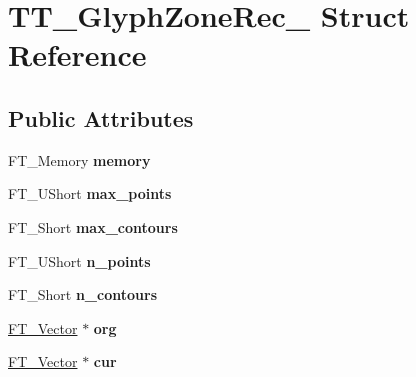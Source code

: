 \hypertarget{struct_t_t___glyph_zone_rec__}{}\section{T\+T\+\_\+\+Glyph\+Zone\+Rec\+\_\+ Struct Reference}
\label{struct_t_t___glyph_zone_rec__}
\subsection*{Public Attributes}
\begin{DoxyCompactItemize}
\item 
\mbox{\label{struct_t_t___glyph_zone_rec___adc8cac6d6d8475aa50946d6bc17fd345}} 
F\+T\+\_\+\+Memory {\bfseries memory}
\item 
\mbox{\label{struct_t_t___glyph_zone_rec___aa06aa1bfd1b7e2082552ea24f96c775e}} 
F\+T\+\_\+\+U\+Short {\bfseries max\+\_\+points}
\item 
\mbox{\label{struct_t_t___glyph_zone_rec___adf1671187fe804f0a117edb76f8cfd12}} 
F\+T\+\_\+\+Short {\bfseries max\+\_\+contours}
\item 
\mbox{\label{struct_t_t___glyph_zone_rec___a2acc389958f0e593f7eed29f7ca15b94}} 
F\+T\+\_\+\+U\+Short {\bfseries n\+\_\+points}
\item 
\mbox{\label{struct_t_t___glyph_zone_rec___a1aa2ffa863fbd8a8985fe3e39e8bb92a}} 
F\+T\+\_\+\+Short {\bfseries n\+\_\+contours}
\item 
\mbox{\label{struct_t_t___glyph_zone_rec___a240879d0a1a6dd487b84f3b3723f9058}} 
\hyperlink{struct_f_t___vector__}{F\+T\+\_\+\+Vector} $\ast$ {\bfseries org}
\item 
\mbox{\label{struct_t_t___glyph_zone_rec___a5dc4b386729ab85619a7132f69714991}} 
\hyperlink{struct_f_t___vector__}{F\+T\+\_\+\+Vector} $\ast$ {\bfseries cur}
\item 
\mbox{\label{struct_t_t___glyph_zone_rec___a4b4193dbae177435cb6515f9a0537fa0}} 

\end{DoxyCompactItemize}

